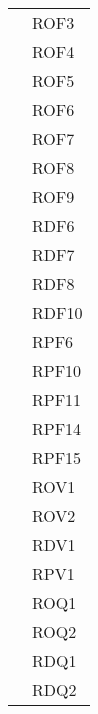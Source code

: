\begin{longtable}{| p{5cm} | p{5cm} |}
		\rowcolor{LightGray}
		\multirow[t]{23}{*}{\cellcolor{LightGray}}{Capitolato} 
				 & ROF3 \\
				\rowcolor{LightGray} &	ROF4 \\
				\rowcolor{LightGray} &	ROF5 \\
				\rowcolor{LightGray} &	ROF6 \\
				\rowcolor{LightGray} &	ROF7 \\
				\rowcolor{LightGray} &	ROF8 \\
				\rowcolor{LightGray} &	ROF9 \\
				\rowcolor{LightGray} &	RDF6 \\
				\rowcolor{LightGray} &	RDF7 \\
				\rowcolor{LightGray} &	RDF8 \\
				\rowcolor{LightGray} &	RDF10 \\
				\rowcolor{LightGray} &	RPF6 \\
				\rowcolor{LightGray} &	RPF10 \\
				\rowcolor{LightGray} &	RPF11 \\
				\rowcolor{LightGray} &	RPF14 \\
				\rowcolor{LightGray} &	RPF15 \\
				\rowcolor{LightGray} &	ROV1 \\
				\rowcolor{LightGray} &	ROV2 \\
				\rowcolor{LightGray} &	RDV1 \\
				\rowcolor{LightGray} &	RPV1 \\
				\rowcolor{LightGray} &	ROQ1 \\
				\rowcolor{LightGray} &	ROQ2\\
				\rowcolor{LightGray} &	RDQ1\\
				\rowcolor{LightGray} &	RDQ2 \\
		

\end{longtable}
